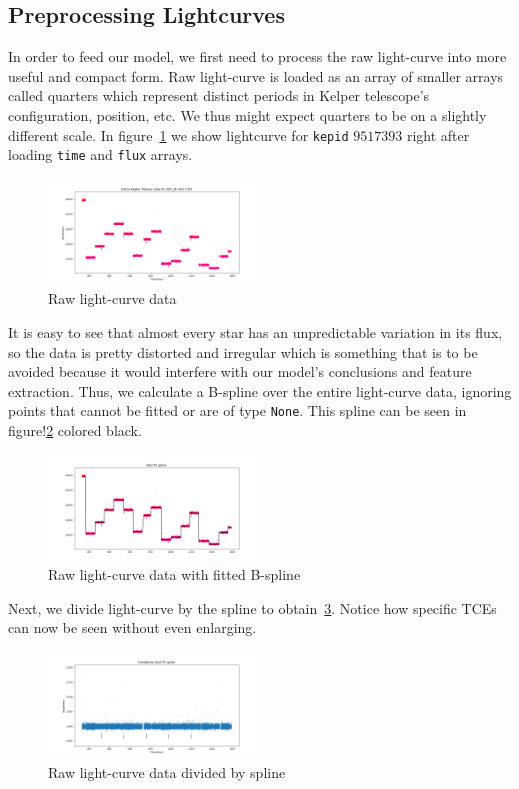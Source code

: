 \documentclass[twoside]{article}
\newcommand{\code}[1]{\texttt{#1}}
\begin{document}
\begin{multicols}{2}
\subsection{Preprocessing Lightcurves}
In order to feed our model, we first need to process the raw light-curve into more useful and compact form. Raw light-curve is loaded as an array of smaller arrays called quarters which represent distinct periods in Kelper telescope's configuration, position, etc. We thus might expect quarters to be on a slightly different scale. In figure~\ref{fig:raw_lc} we show lightcurve for \code{kepid} $9517393$ right after loading \code{time} and \code{flux} arrays.
\begin{figure}[H]
\includegraphics[width=0.5\textwidth]{rawLC-9517393}
\caption{Raw light-curve data}
\label{fig:raw_lc}
\end{figure}

It is easy to see that almost every star has an unpredictable variation in its flux, so the data is pretty distorted and irregular which is something that is to be avoided because it would interfere with our model's conclusions and feature extraction. Thus, we calculate a B-spline over the entire light-curve data, ignoring points that cannot be fitted or are of type \code{None}. This spline can be seen in figure!\ref{fig:raw_spline_lc} colored black.
\begin{figure}[H]
\includegraphics[width=0.5\textwidth]{splineLC-9517393}
\caption{Raw light-curve data with fitted B-spline}
\label{fig:raw_spline_lc}
\end{figure}

Next, we divide light-curve by the spline to obtain~\ref{fig:divided_lc}. Notice how specific TCEs can now be seen without even enlarging. 
\begin{figure}[H]
\includegraphics[width=0.5\textwidth]{divsplineLC-9517393}
\caption{Raw light-curve data divided by spline}
\label{fig:divided_lc}
\end{figure}


\end{multicols}
\end{document}
